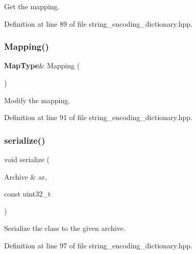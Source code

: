 Get the mapping. 



Definition at line 89 of file string\+\_\+encoding\+\_\+dictionary.\+hpp.

\mbox{\label{classmlpack_1_1data_1_1StringEncodingDictionary_a11a693fe23d0648d295d6715304e4130}} 
\subsubsection{Mapping()\hspace{0.1cm}{\footnotesize\ttfamily [2/2]}}
{\footnotesize\ttfamily \textbf{ Map\+Type}\& Mapping (\begin{DoxyParamCaption}{ }\end{DoxyParamCaption})\hspace{0.3cm}{\ttfamily [inline]}}



Modify the mapping. 



Definition at line 91 of file string\+\_\+encoding\+\_\+dictionary.\+hpp.

\mbox{\label{classmlpack_1_1data_1_1StringEncodingDictionary_a65cba07328997659bec80b9879b15a51}} 
\subsubsection{serialize()}
{\footnotesize\ttfamily void serialize (\begin{DoxyParamCaption}\item[{Archive \&}]{ar,  }\item[{const uint32\+\_\+t}]{ }\end{DoxyParamCaption})\hspace{0.3cm}{\ttfamily [inline]}}



Serialize the class to the given archive. 



Definition at line 97 of file string\+\_\+encoding\+\_\+dictionary.\+hpp.

